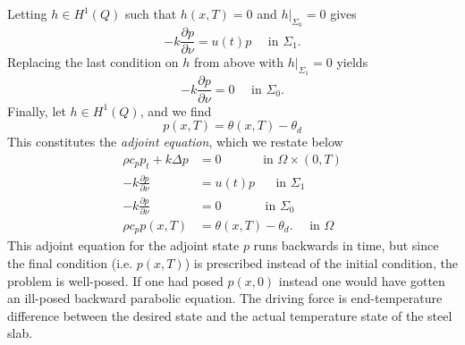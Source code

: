 Letting $h\in H^1(Q)$ such that $h(x, T) = 0$ and $h|_{\Sigma_0}=0$ gives
\begin{equation*}
  -k\frac{\partial p}{\partial\nu} = u(t)p \quad\textrm{ in } \Sigma_1.
\end{equation*}
Replacing the last condition on $h$ from above with $h|_{\Sigma_1}=0$ yields
\begin{equation*}
  -k\frac{\partial p}{\partial\nu} = 0 \quad\textrm{ in } \Sigma_0.
\end{equation*}
Finally, let $h\in H^1(Q)$, and we find
\begin{equation*}
  p(x, T) = \theta(x, T) - \theta_d
\end{equation*}
This constitutes the \textit{adjoint equation}, which we restate below
\begin{subequations}\label{eq:adjoint-system}
   \begin{align} %
      \rho c_p p_t + k\Delta p &= 0 \quad\qquad\textrm{ in } \Omega \times (0,T) \label{eq:adjoint-system-eqn} \\
      {-k}\frac{\partial p}{\partial\nu} &= u(t)p \,\,\quad\textrm{ in } \Sigma_1 \label{eq:adjoint-system-bd-1} \\
      {-k}\frac{\partial p}{\partial\nu} &= 0 \,\quad\qquad\textrm{ in } \Sigma_0 \label{eq:adjoint-system-bd-2} \\
      \rho c_p p(x, T) &= \theta(x, T) - \theta_d. \quad \textrm{ in } \Omega
   \end{align}
   \label{eq:adjoint-eqn}
\end{subequations}
This adjoint equation for the adjoint state $p$ runs backwards in time, but since the final condition (i.e. $p(x,T)$) is prescribed instead of the initial condition, the problem is well-posed. If one had posed $p(x, 0)$ instead one would have gotten an ill-posed backward parabolic equation. The driving force is end-temperature difference between the desired state and the actual temperature state of the steel slab.

